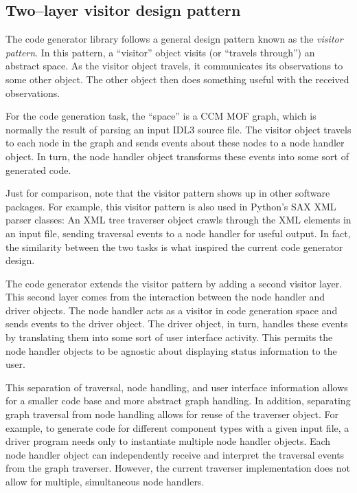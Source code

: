 \subsection{Two--layer visitor design pattern}

The code generator library follows a general design pattern known as the {\em
visitor pattern\/}. In this pattern, a ``visitor'' object visits (or ``travels
through'') an abstract space. As the visitor object travels, it communicates its
observations to some other object. The other object then does something useful
with the received observations.

For the code generation task, the ``space'' is a CCM MOF graph, which is
normally the result of parsing an input IDL3 source file. The visitor object
travels to each node in the graph and sends events about these nodes to a node
handler object. In turn, the node handler object transforms these events into
some sort of generated code.

Just for comparison, note that the visitor pattern shows up in other software
packages. For example, this visitor pattern is also used in Python's SAX XML
parser classes: An XML tree traverser object crawls through the XML elements in
an input file, sending traversal events to a node handler for useful output. In
fact, the similarity between the two tasks is what inspired the current code
generator design.

The code generator extends the visitor pattern by adding a second visitor layer.
This second layer comes from the interaction between the node handler and driver
objects. The node handler acts as a visitor in code generation space and sends
events to the driver object. The driver object, in turn, handles these events by
translating them into some sort of user interface activity. This permits the
node handler objects to be agnostic about displaying status information to the
user.

This separation of traversal, node handling, and user interface information
allows for a smaller code base and more abstract graph handling. In addition,
separating graph traversal from node handling allows for reuse of the traverser
object. For example, to generate code for different component types with a given
input file, a driver program needs only to instantiate multiple node handler
objects. Each node handler object can independently receive and interpret the
traversal events from the graph traverser. However, the current traverser
implementation does not allow for multiple, simultaneous node handlers.

